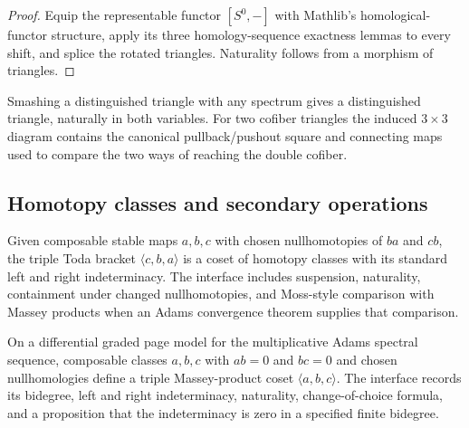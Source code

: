 \begin{proof}
  Equip the representable functor $[S^0,-]$ with Mathlib's homological-functor
  structure, apply its three homology-sequence exactness lemmas to every
  shift, and splice the rotated triangles.  Naturality follows from a morphism
  of triangles.
\end{proof}

\begin{definition}
  \label{def:smash-triangle}
  \notready
  Smashing a distinguished triangle with any spectrum gives a distinguished
  triangle, naturally in both variables.  For two cofiber triangles the
  induced $3\times3$ diagram contains the canonical pullback/pushout square
  and connecting maps used to compare the two ways of reaching the double
  cofiber.
\end{definition}

\subsection{Homotopy classes and secondary operations}

\begin{definition}
  \label{def:toda-bracket}
  \notready
  Given composable stable maps $a,b,c$ with chosen nullhomotopies of $ba$ and
  $cb$, the triple Toda bracket $\langle c,b,a\rangle$ is a coset of homotopy
  classes with its standard left and right indeterminacy.  The interface
  includes suspension, naturality, containment under changed nullhomotopies,
  and Moss-style comparison with Massey products when an Adams convergence
  theorem supplies that comparison.
\end{definition}

\begin{definition}
  \label{def:massey-product}
  \notready
  On a differential graded page model for the multiplicative Adams spectral
  sequence, composable classes $a,b,c$ with $ab=0$ and $bc=0$ and chosen
  nullhomologies define a triple Massey-product coset
  $\langle a,b,c\rangle$.  The interface records its bidegree, left and right
  indeterminacy, naturality, change-of-choice formula, and a proposition that
  the indeterminacy is zero in a specified finite bidegree.
\end{definition}
